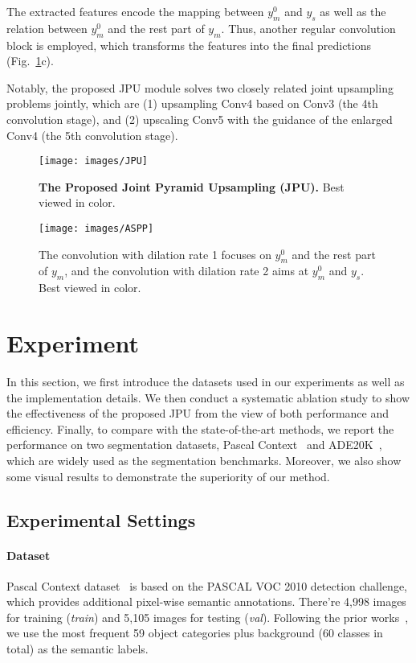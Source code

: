 \documentclass[10pt,twocolumn,letterpaper]{article}
\begin{document}
The extracted features encode the mapping between $y_m^{0}$ and $y_s$ as well as the relation between $y_m^{0}$ and the rest part of $y_m$.
Thus, another regular convolution block is employed, which transforms the features into the final predictions (Fig.~\ref{fig:jpu}c).

Notably, the proposed JPU module solves two closely related joint upsampling problems jointly, which are (1) upsampling Conv4 based on Conv3 (the 4th convolution stage), and (2) upscaling Conv5 with the guidance of the enlarged Conv4 (the 5th convolution stage).
\begin{figure} 
\begin{center}
	\texttt{[image: images/JPU]}
\end{center}
	\caption{\textbf{The Proposed Joint Pyramid Upsampling (JPU).} Best viewed in color.}
	\label{fig:jpu}
\end{figure}
\begin{figure} 
\begin{center}
	\texttt{[image: images/ASPP]}
\end{center}
	\caption{The convolution with dilation rate 1 focuses on $y_m^0$ and the rest part of $y_m$, and the convolution with dilation rate 2 aims at $y_m^0$ and $y_s$. Best viewed in color.}
	\label{fig:aspp}
\end{figure}
\section{Experiment}
In this section, we first introduce the datasets used in our experiments as well as the implementation details.
We then conduct a systematic ablation study to show the effectiveness of the proposed JPU from the view of both performance and efficiency.
Finally, to compare with the state-of-the-art methods, we report the performance on two segmentation datasets, Pascal Context~\cite{mottaghi2014role} and ADE20K~\cite{zhou2017scene}, which are widely used as the segmentation benchmarks.
Moreover, we also show some visual results to demonstrate the superiority of our method.
\subsection{Experimental Settings}
\paragraph{Dataset}
Pascal Context dataset~\cite{mottaghi2014role} is based on the PASCAL VOC 2010 detection challenge, which provides additional pixel-wise semantic annotations.
There're 4,998 images for training (\textit{train}) and 5,105 images for testing (\textit{val}).
Following the prior works~\cite{lin2017refinenet,chen2018deeplab,zhang2018context}, we use the most frequent 59 object categories plus background (60 classes in total) as the semantic labels.
\vspace{-1em}
\end{document}
